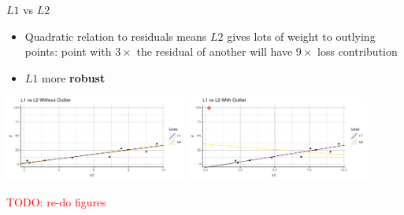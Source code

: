 \documentclass[11pt,compress,t,notes=noshow, xcolor=table]{beamer}
\begin{document}
\begin{vbframe}{$L1$ vs $L2$}

\begin{itemize}
    \item Quadratic relation to residuals means $L2$ gives lots of weight to 
    outlying points: point with $3 \times$ the residual of another will have 
    $9 \times$ loss contribution
    \item $L1$ more \textbf{robust}
\end{itemize}

\vfill
\includegraphics[width=0.45\textwidth]{figure_man/l2-vs-l1-1.pdf}
\includegraphics[width=0.45\textwidth]{figure_man/l2-vs-l1-2.pdf}

\textcolor{red}{TODO: re-do figures}

\end{vbframe}

\endlecture
\end{document}
